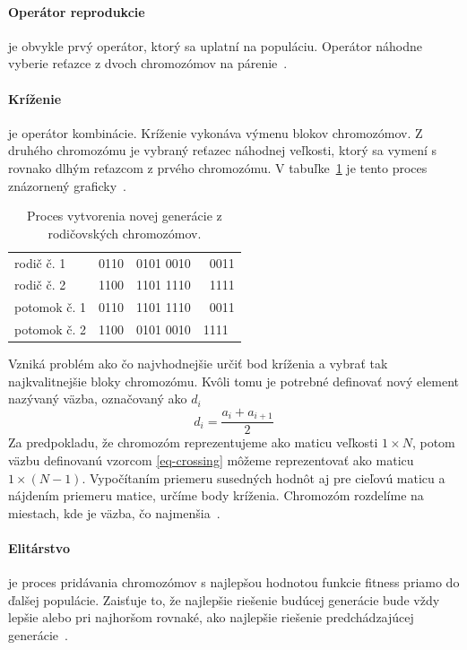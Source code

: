 \documentclass[a4paper,slovak,12pt,appendix]{article}
\begin{document}
\paragraph{Operátor reprodukcie} je obvykle prvý operátor, ktorý sa uplatní na
populáciu. Operátor náhodne vyberie reťazce z dvoch chromozómov na
párenie~\cite{Chavan2015}.

\paragraph{Kríženie} je operátor kombinácie. Kríženie vykonáva výmenu blokov
chromozómov. Z druhého chromozómu je vybraný reťazec náhodnej veľkosti, ktorý
sa vymení s rovnako dlhým reťazcom z prvého chromozómu.
V tabuľke~\ref{tab-crossing} je tento proces znázornený
graficky~\cite{Chavan2015}.

\begin{table}[H]
  \centering
  \caption{Proces vytvorenia novej generácie z rodičovských chromozómov.}
  \label{tab-crossing}
  \begin{tabular}{p{4cm}l|l|l}
    rodič č. 1      &  0110 & 0101  0010 & 0011  \\
    rodič č. 2      &  1100 & 1101  1110 & 1111  \\
    \hline
    potomok č. 1    &  0110 & 1101  1110 & 0011  \\
    potomok č. 2    &  1100 & 0101  0010 & 1111  \\
  \end{tabular}
\end{table}

Vzniká problém ako čo najvhodnejšie určiť bod kríženia a vybrať tak
najkvalitnejšie bloky chromozómu. Kvôli tomu je potrebné definovať nový element
nazývaný väzba, označovaný ako $d_i$
\begin{equation}
  d_i = \frac{a_i + a_{i+1}}{2}
  \label{eq-crossing}
\end{equation}
Za predpokladu, že chromozóm reprezentujeme ako maticu veľkosti $1 \times N$,
potom väzbu definovanú vzorcom \ref{eq-crossing} môžeme reprezentovať ako
maticu $1 \times (N-1)$. Vypočítaním priemeru susedných hodnôt aj pre cieľovú
maticu a nájdením priemeru matice, určíme body kríženia. Chromozóm rozdelíme na
miestach, kde je väzba, čo najmenšia~\cite{Simonova2007}.

\paragraph{Elitárstvo} je proces pridávania chromozómov s najlepšou hodnotou
funkcie fitness priamo do ďalšej populácie. Zaisťuje to, že najlepšie riešenie
budúcej generácie bude vždy lepšie alebo pri najhoršom rovnaké, ako najlepšie
riešenie predchádzajúcej generácie~\cite{Deolekar2016}.
\end{document}
